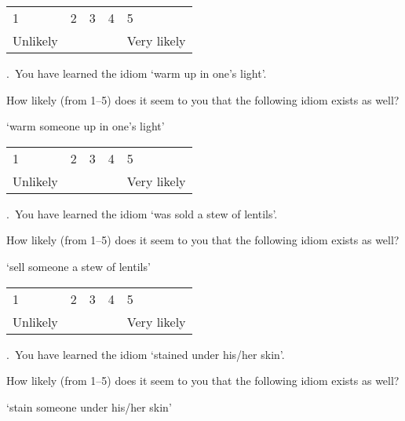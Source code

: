 \documentclass[output=paper]{langsci/langscibook}
\begin{document}
\noindent \begin{tabularx}{\textwidth}{XXXXX}
        1 & 2 & 3 & 4 & 5\\
        Unlikely & & & & Very likely\\
        \end{tabularx}\vspace{1\baselineskip}

.\ You have learned the idiom \enquote*{{warm up in one's light}}.

\noindent How likely (from 1--5) does it seem to you that the following idiom exists
    as well?\vspace{.5\baselineskip}

\noindent \enquote*{{warm someone up in one's light}}\vspace{.5\baselineskip}

\noindent \begin{tabularx}{\textwidth}{XXXXX}
        1 & 2 & 3 & 4 & 5\\
        Unlikely & & & & Very likely\\
        \end{tabularx}\vspace{1\baselineskip}

.\ You have learned the idiom \enquote*{{was sold a stew of lentils}}.

\noindent How likely (from 1--5) does it seem to you that the following idiom exists
    as well?\vspace{.5\baselineskip}

\noindent \enquote*{{sell someone a stew of lentils}}\vspace{.5\baselineskip}

\noindent \begin{tabularx}{\textwidth}{XXXXX}
        1 & 2 & 3 & 4 & 5\\
        Unlikely & & & & Very likely\\
        \end{tabularx}\vspace{1\baselineskip}


.\ You have learned the idiom \enquote*{{stained under his/her
    skin}}.

\noindent How likely (from 1--5) does it seem to you that the following idiom exists
    as well?\vspace{.5\baselineskip}

\noindent \enquote*{{stain someone under his/her skin}}\vspace{.5\baselineskip}
\end{document}
